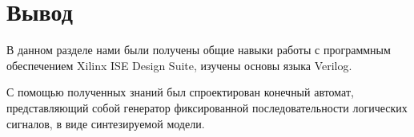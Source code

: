\section{Вывод}
  В данном разделе нами были получены общие навыки работы с программным обеспечением Xilinx ISE Design Suite, изучены основы языка Verilog.

С помощью полученных знаний был спроектирован конечный автомат, представляющий собой генератор
фиксированной последовательности логических сигналов, в виде синтезируемой модели.

